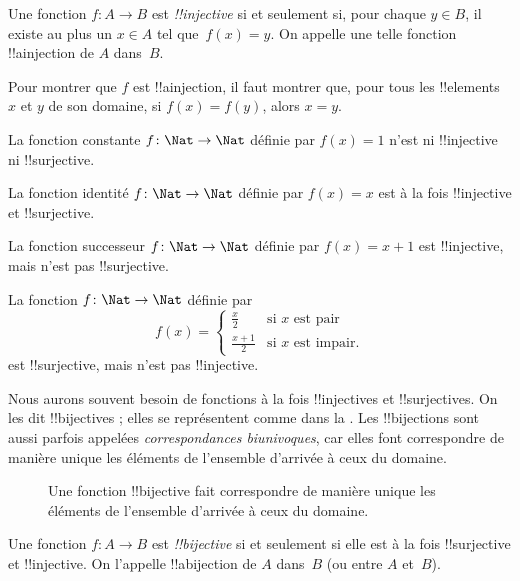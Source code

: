 \documentclass[11pt,a4paper,openany]{memoir}
\begin{document}
\begin{defn}
Une fonction $f \colon A \rightarrow B$ est \emph{!!{injective}} si et
seulement si, pour chaque $y \in B$, il existe au plus un $x \in A$
tel que~$f(x) = y$. On appelle une telle fonction !!a{injection}
de $A$ dans~$B$.
\end{defn}

\begin{explain}
Pour montrer que $f$ est !!a{injection}, il faut montrer que,
pour tous les !!{element}s $x$ et $y$ de son domaine,
si $f(x)=f(y)$, alors $x=y$.
\end{explain}

\begin{ex}
La fonction constante $f\colon \Nat \to \Nat$ définie par $f(x) = 1$
n’est ni !!{injective} ni !!{surjective}.

La fonction identité $f\colon \Nat \to \Nat$ définie par $f(x) = x$
est à la fois !!{injective} et !!{surjective}.

La fonction successeur $f \colon \Nat \to \Nat$ définie par $f(x) = x+1$
est !!{injective}, mais n’est pas !!{surjective}.

La fonction $f \colon \Nat \to \Nat$ définie par
\[
  f(x) =
  \begin{cases}
    \frac{x}{2} & \text{si $x$ est pair} \\
    \frac{x+1}{2} & \text{si $x$ est impair.}
  \end{cases}
\]
est !!{surjective}, mais n’est pas !!{injective}.
\end{ex}

\begin{explain}
Nous aurons souvent besoin de fonctions à la fois !!{injective}s et
!!{surjective}s. On les dit !!{bijective}s ; elles se représentent
comme dans la . Les !!{bijection}s sont aussi
parfois appelées \emph{correspondances biunivoques}, car elles font
correspondre de manière unique les éléments de l’ensemble d’arrivée
à ceux du domaine.
\begin{figure}
  \caption{Une fonction !!{bijective} fait correspondre de manière unique
    les éléments de l’ensemble d’arrivée à ceux du domaine.}
\end{figure}
\end{explain}

\begin{defn}[!!^{bijection}]
Une fonction $f \colon A \to B$ est \emph{!!{bijective}} si et seulement
si elle est à la fois !!{surjective} et !!{injective}.
On l’appelle !!a{bijection} de $A$ dans~$B$ (ou entre $A$ et~$B$).
\end{defn}
\end{document}

